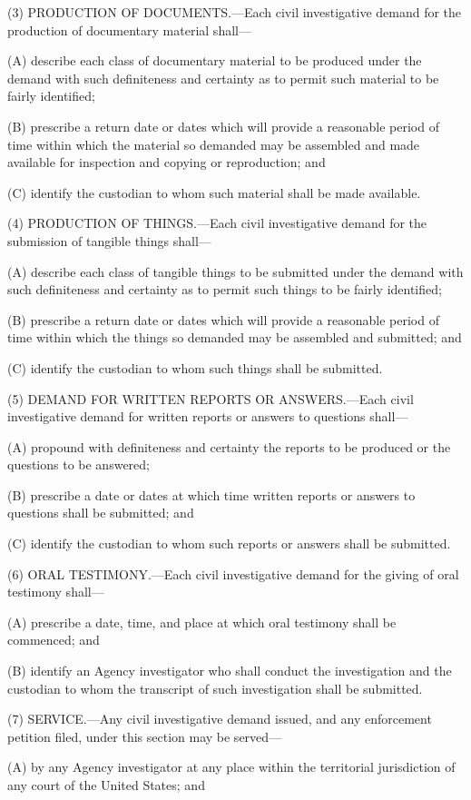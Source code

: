 (3) PRODUCTION OF DOCUMENTS.—Each civil investigative demand for the production of documentary material shall—

(A) describe each class of documentary material to be produced under the demand with such definiteness and certainty as to permit such material to be fairly identified;

(B) prescribe a return date or dates which will provide a reasonable period of time within which the material so demanded may be assembled and made available for inspection and copying or reproduction; and

(C) identify the custodian to whom such material shall be made available.

(4) PRODUCTION OF THINGS.—Each civil investigative demand for the submission of tangible things shall—

(A) describe each class of tangible things to be submitted under the demand with such definiteness and certainty as to permit such things to be fairly identified;

(B) prescribe a return date or dates which will provide a reasonable period of time within which the things so demanded may be assembled and submitted; and

(C) identify the custodian to whom such things shall be submitted.

(5) DEMAND FOR WRITTEN REPORTS OR ANSWERS.—Each civil investigative demand for written reports or answers to questions shall—

(A) propound with definiteness and certainty the reports to be produced or the questions to be answered;

(B) prescribe a date or dates at which time written reports or answers to questions shall be submitted; and

(C) identify the custodian to whom such reports or answers shall be submitted.

(6) ORAL TESTIMONY.—Each civil investigative demand for the giving of oral testimony shall—

(A) prescribe a date, time, and place at which oral testimony shall be commenced; and

(B) identify an Agency investigator who shall conduct the investigation and the custodian to whom the transcript of such investigation shall be submitted.

(7) SERVICE.—Any civil investigative demand issued, and any enforcement petition filed, under this section may be served—

(A) by any Agency investigator at any place within the territorial jurisdiction of any court of the United States; and

